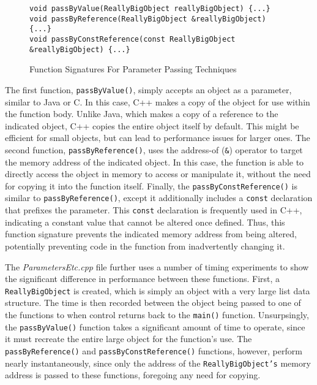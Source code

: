 \documentclass[11pt]{article}
\begin{document}
\begin{figure}[!h]
\centering
\begin{BVerbatim}
void passByValue(ReallyBigObject reallyBigObject) {...}
void passByReference(ReallyBigObject &reallyBigObject) {...}
void passByConstReference(const ReallyBigObject &reallyBigObject) {...}
\end{BVerbatim}
\caption{Function Signatures For Parameter Passing Techniques}
\end{figure} \FloatBarrier	

\noindent
The first function, \texttt{passByValue()}, simply accepts an object as a parameter, similar to Java or C.  In this case, C++ makes a copy of the object for use within the function body.  Unlike Java, which makes a copy of a reference to the indicated object, C++ copies the entire object itself by default.  This might be efficient for small objects, but can lead to performance issues for larger ones.  The second function, \texttt{passByReference()}, uses the address-of (\texttt{\&}) operator to target the memory address of the indicated object.  In this case, the function is able to directly access the object in memory to access or manipulate it, without the need for copying it into the function itself.  Finally, the \texttt{passByConstReference()} is similar to \texttt{passByReference()}, except it additionally includes a \texttt{const} declaration that prefixes the parameter.  This \texttt{const} declaration is frequently used in C++, indicating a constant value that cannot be altered once defined.  Thus, this function signature prevents the indicated memory address from being altered, potentially preventing code in the function from inadvertently changing it.

	The \textit{ParametersEtc.cpp} file further uses a number of timing experiments to show the significant difference in performance between these functions.  First, a \texttt{ReallyBigObject} is created, which is simply an object with a very large list data structure.  The time is then recorded between the object being passed to one of the functions to when control returns back to the \texttt{main()} function.  Unsurpsingly, the \texttt{passByValue()} function takes a significant amount of time to operate, since it must recreate the entire large object for the function's use.  The \texttt{passByReference()} and \texttt{passByConstReference()} functions, however, perform nearly instantaneously, since only the address of the \texttt{ReallyBigObject's} memory address is passed to these functions, foregoing any need for copying.
	
\end{document}
